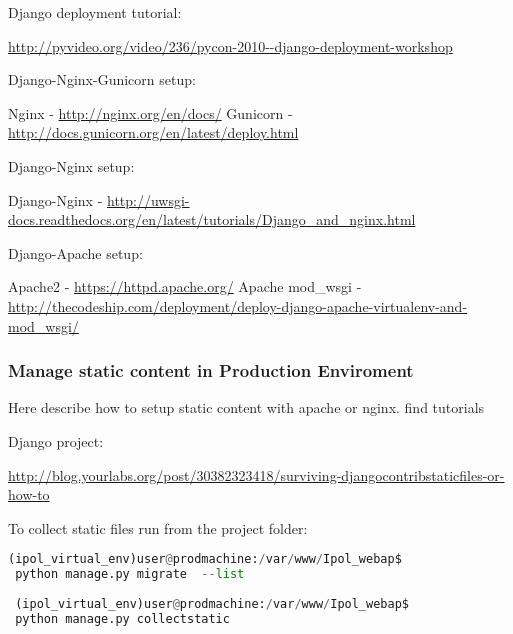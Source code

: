 Django deployment tutorial:

\url{http://pyvideo.org/video/236/pycon-2010--django-deployment-workshop}


Django-Nginx-Gunicorn setup:

Nginx - \url{http://nginx.org/en/docs/}
Gunicorn - \url{http://docs.gunicorn.org/en/latest/deploy.html}


Django-Nginx setup:

Django-Nginx - \url{http://uwsgi-docs.readthedocs.org/en/latest/tutorials/Django_and_nginx.html}


Django-Apache setup:

Apache2 - \url{https://httpd.apache.org/}
Apache mod\_wsgi - \url{http://thecodeship.com/deployment/deploy-django-apache-virtualenv-and-mod_wsgi/}



\subsubsection{Manage static content in Production Enviroment }
Here describe how to setup static content with apache or nginx. find tutorials

Django project:

\url{http://blog.yourlabs.org/post/30382323418/surviving-djangocontribstaticfiles-or-how-to}

To collect static files run from the project folder:
\begin{lstlisting}[language=Python,firstnumber=1]
 (ipol_virtual_env)user@prodmachine:/var/www/Ipol_webap$ 
 python manage.py migrate  --list
 
 (ipol_virtual_env)user@prodmachine:/var/www/Ipol_webap$ 
 python manage.py collectstatic
\end{lstlisting}
